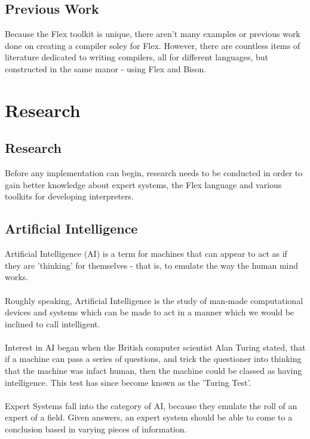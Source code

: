 \documentclass[12pt]{report}
\begin{document}
\section{Previous Work}\label{sec:previous_work}
Because the Flex toolkit is unique, there aren't many examples or previous work done on creating a compiler soley for Flex.  However, there are countless items of literature dedicated to writing compilers, all for different languages, but constructed in the same manor - using Flex and Bison.

\chapter{Research}
\section[Research]{Research}\label{sec:intro_to_research}
Before any implementation can begin, research needs to be conducted in order to gain better knowledge about expert systems, the Flex language and various toolkits for developing interpreters.

\section{Artificial Intelligence}\label{sec:AI}
Artificial Intelligence (AI) is a term for machines that can appear to act as if they are 'thinking' for themselves - that is, to emulate the way the human mind works.\\
\\
Roughly speaking, Artificial Intelligence is the study of man-made computational devices and systems which can be made to act in a manner which we would be inclined to call intelligent. \citep{whatisai}
\\
\\
Interest in AI began when the British computer scientist Alan Turing stated, that if a machine can pass a series of questions, and trick the questioner into thinking that the machine was infact human, then the machine could be classed as having intelligence.  This test has since become known as the 'Turing Test'.\\
\\
Expert Systems fall into the category of AI, because they emulate the roll of an expert of a field.  Given answers, an expert system should be able to come to a conclusion based in varying pieces of information.
\end{document}
